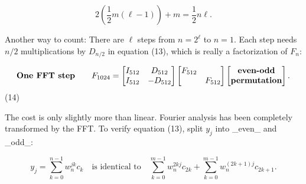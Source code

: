 \[2\left(\frac{1}{2}m(\ell-1)\right)+m=\frac{1}{2}n\ell.\]

Another way to count: There are \(\ell\) steps from \(n=2^{\ell}\) to \(n=1\). Each step needs \(n/2\) multiplications by \(D_{n/2}\) in equation (13), which is really a factorization of \(F_{n}\):

\[\text{\bf One FFT step}\qquad F_{1024}=\begin{bmatrix}I_{512}&D_{512}\\ I_{512}&-D_{512}\end{bmatrix}\begin{bmatrix}F_{512}&\\ &F_{512}\end{bmatrix}\begin{bmatrix}\text{\bf even-odd}\\ \text{\bf permutation}\end{bmatrix}.\] (14)

The cost is only slightly more than linear. Fourier analysis has been completely transformed by the FFT. To verify equation (13), split \(y_{j}\) into _even_ and _odd_:

\[y_{j}=\sum_{k=0}^{n-1}w^{jk}_{n}c_{k}\quad\text{is identical to}\quad\sum_{k=0}^{m-1}w^{2 kj}_{n}c_{2k}+\sum_{k=0}^{m-1}w^{(2k+1)j}_{n}c_{2k+1}.\] 